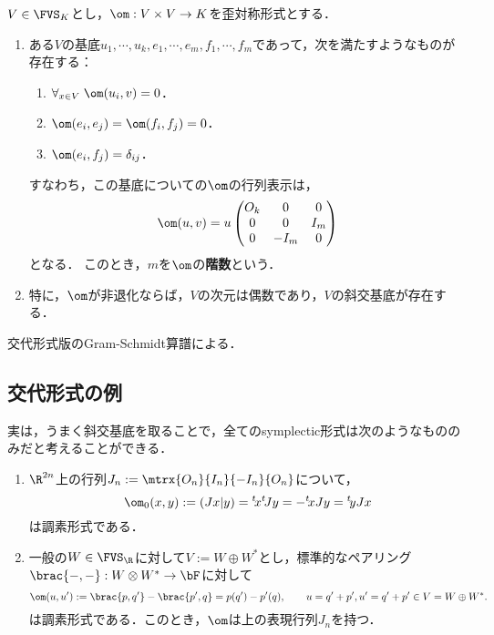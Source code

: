 \documentclass[uplatex,dvipdfmx]{jsreport}
\begin{document}
\begin{theorem}[symplectic基底の存在]\label{thm-existence-of-symplectic-basis}
    $V\in\FVS_K$とし，$\om:V\times V\to K$を歪対称形式とする．
    \begin{enumerate}
        \item ある$V$の基底$u_1,\cdots,u_k,e_1,\cdots,e_m,f_1,\cdots,f_m$であって，次を満たすようなものが存在する：
        \begin{enumerate}
            \item $\forall_{x\in V}\;\om(u_i,v)=0$．
            \item $\om(e_i,e_j)=\om(f_i,f_j)=0$．
            \item $\om(e_i,f_j)=\delta_{ij}$．
        \end{enumerate}
        すなわち，この基底についての$\om$の行列表示は，
        \[\om(u,v)=u\begin{pmatrix}
            O_k&0&0\\
            0&0&I_m\\
            0&-I_m&0
        \end{pmatrix}\]
        となる．
        このとき，$m$を$\om$の\textbf{階数}という．
        \item 特に，$\om$が非退化ならば，$V$の次元は偶数であり，$V$の斜交基底が存在する．
    \end{enumerate}
\end{theorem}
\begin{Proof}
    交代形式版のGram-Schmidt算譜による．
\end{Proof}

\subsection{交代形式の例}

\begin{example}[symplectic形式の本質的にすべての例]
    実は，うまく斜交基底を取ることで，全てのsymplectic形式は次のようなもののみだと考えることができる．
    \begin{enumerate}
        \item $\R^{2n}$上の行列$J_n:=\mtrx{O_n}{I_n}{-I_n}{O_n}$について，
        \[\om_0(x,y):=(Jx|y)={}^t\!x{}^t\!Jy=-{}^t\!xJy={}^t\!yJx\]
        は調素形式である．
        \item 一般の$W\in\FVS_\R$に対して$V:=W\oplus W^*$とし，標準的なペアリング$\brac{-,-}:W\otimes W^*\to\bF$に対して
        \[\om(u,u'):=\brac{p,q'}-\brac{p',q}=p(q')-p'(q),\qquad u=q'+p',u'=q'+p'\in V=W\oplus W^*.\]
        は調素形式である．このとき，$\om$は上の表現行列$J_n$を持つ．
    \end{enumerate}
\end{example}
\end{document}
